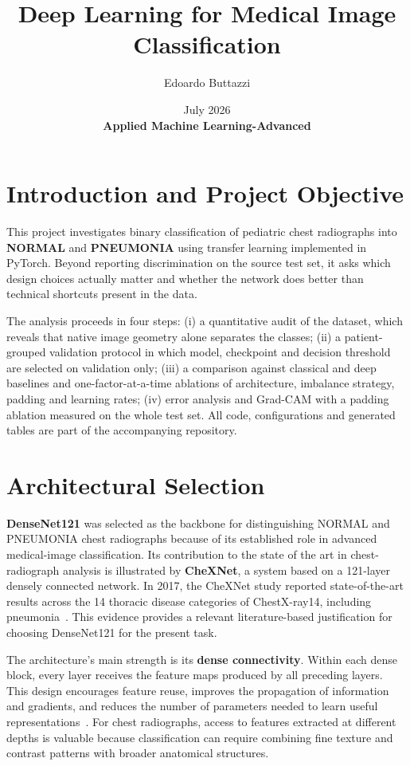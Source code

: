 \documentclass[12pt,letterpaper]{article}
\title{\vspace{5 cm}Deep Learning for Medical Image Classification\vspace{1cm}}
\author{Edoardo Buttazzi}
\date{July 2026\\\vspace{1.5cm} \textbf{Applied Machine Learning-Advanced }}
\begin{document}
\maketitle
\clearpage
\tableofcontents
\newpage
\section{Introduction and Project Objective}
This project investigates binary classification of pediatric chest radiographs into \textbf{NORMAL} and \textbf{PNEUMONIA} using transfer learning implemented in PyTorch. Beyond reporting discrimination on the source test set, it asks which design choices actually matter and whether the network does better than technical shortcuts present in the data.

The analysis proceeds in four steps: (i) a quantitative audit of the dataset, which reveals that native image geometry alone separates the classes; (ii) a patient-grouped validation protocol in which model, checkpoint and decision threshold are selected on validation only; (iii) a comparison against classical and deep baselines and one-factor-at-a-time ablations of architecture, imbalance strategy, padding and learning rates; (iv) error analysis and Grad-CAM with a padding ablation measured on the whole test set. All code, configurations and generated tables are part of the accompanying repository.
\newpage

\section{Architectural Selection}
\textbf{DenseNet121} was selected as the backbone for distinguishing NORMAL and PNEUMONIA chest radiographs because of its established role in advanced medical-image classification. Its contribution to the state of the art in chest-radiograph analysis is illustrated by \textbf{CheXNet}, a system based on a 121-layer densely connected network. In 2017, the CheXNet study reported state-of-the-art results across the 14 thoracic disease categories of ChestX-ray14, including pneumonia~\cite{rajpurkar2017chexnet}. This evidence provides a relevant literature-based justification for choosing DenseNet121 for the present task.

The architecture's main strength is its \textbf{dense connectivity}. Within each dense block, every layer receives the feature maps produced by all preceding layers. This design encourages feature reuse, improves the propagation of information and gradients, and reduces the number of parameters needed to learn useful representations~\cite{huang2017densenet}. For chest radiographs, access to features extracted at different depths is valuable because classification can require combining fine texture and contrast patterns with broader anatomical structures.
\end{document}
